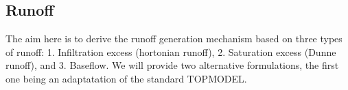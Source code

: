 \documentclass[twoside,10pt]{report}
\begin{document}


\subsection{Runoff}
The aim here is to derive the runoff generation mechanism based on three types of runoff: 1. Infiltration excess (hortonian runoff), 2. Saturation excess (Dunne runoff), and 3. Baseflow. We will provide two alternative formulations, the first one being an adaptatation of the standard TOPMODEL.
\end{document}

